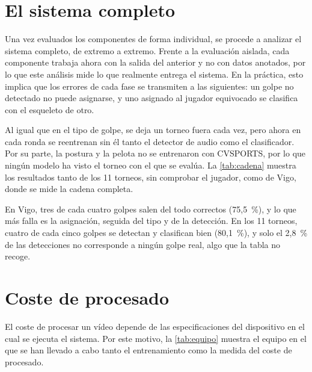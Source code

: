 \section{El sistema completo}
\label{sec:sistema-completo}

Una vez evaluados los componentes de forma individual, se procede a analizar el sistema completo, de extremo a extremo.
Frente a la evaluación aislada, cada componente trabaja ahora con la salida del anterior y no con datos anotados, por lo que este análisis mide lo que realmente entrega el sistema.
En la práctica, esto implica que los errores de cada fase se transmiten a las siguientes: un golpe no detectado no puede asignarse, y uno asignado al jugador equivocado se clasifica con el esqueleto de otro.

Al igual que en el tipo de golpe, se deja un torneo fuera cada vez, pero ahora en cada ronda se reentrenan sin él tanto el detector de audio como el clasificador.
Por su parte, la postura y la pelota no se entrenaron con CVSPORTS, por lo que ningún modelo ha visto el torneo con el que se evalúa.
La \cref{tab:cadena} muestra los resultados tanto de los 11 torneos, sin comprobar el jugador, como de Vigo, donde se mide la cadena completa.

\begin{table}[htbp]
  \centering
  \caption{Sistema completo por etapas: porcentaje de golpes reales que superan cada etapa y todas las anteriores.}
  \label{tab:cadena}
  
\end{table}

En Vigo, tres de cada cuatro golpes salen del todo correctos (75,5~\%), y lo que más falla es la asignación, seguida del tipo y de la detección.
En los 11 torneos, cuatro de cada cinco golpes se detectan y clasifican bien (80,1~\%), y solo el 2,8~\% de las detecciones no corresponde a ningún golpe real, algo que la tabla no recoge.

\section{Coste de procesado}
\label{sec:coste}

El coste de procesar un vídeo depende de las especificaciones del dispositivo en el cual se ejecuta el sistema.
Por este motivo, la \cref{tab:equipo} muestra el equipo en el que se han llevado a cabo tanto el entrenamiento como la medida del coste de procesado.

\begin{table}[htbp]
  \centering
  \caption{Equipo con el que se ha medido el coste de procesado.}
  \label{tab:equipo}
  
\end{table}

